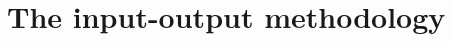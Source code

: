 \documentclass[12pt,english]{article}
\begin{document}
%
%
%


\section{The input-output methodology}

\end{document}
